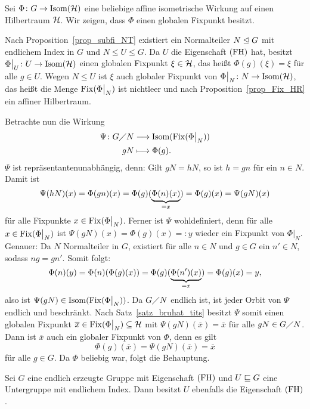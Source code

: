 \begin{beweis}
	Sei $\Phi\colon G \rightarrow \operatorname{Isom}(\mathcal{H})$ eine beliebige affine isometrische Wirkung auf einen Hilbertraum $\mathcal{H}$. Wir zeigen, dass $\Phi$ einen globalen Fixpunkt besitzt.
	
	Nach Proposition~\ref{prop_subfi_NT} existiert ein Normalteiler $N \trianglelefteq G$ mit endlichem Index in $G$ und $N \leq U \leq G$. Da $U$ die Eigenschaft $\operatorname{(FH)}$ hat, besitzt $\Phi\big|_U\colon U \rightarrow \operatorname{Isom}(\mathcal{H})$ einen globalen Fixpunkt $\xi \in \mathcal{H}$, das heißt $\Phi(g)(\xi) = \xi$ für alle $g \in U$. Wegen $N \leq U$ ist $\xi$ auch globaler Fixpunkt von $\Phi\big|_N\colon N \rightarrow \operatorname{Isom}(\mathcal{H})$, das heißt die Menge $\operatorname{Fix}(\Phi\big|_N)$ ist nichtleer und nach Proposition~\ref{prop_Fix_HR} ein affiner Hilbertraum.
	
	Betrachte nun die Wirkung
	\begin{equation}
	\begin{aligned}
		\Psi\colon G \diagup N &\longrightarrow \operatorname{Isom}(\operatorname{Fix}(\Phi\big|_N)) \\
		gN &\longmapsto \Phi(g).
	\end{aligned}
	\end{equation}
	$\Psi$ ist repräsentantenunabhängig, denn: Gilt $gN = hN$, so ist $h = gn$ für ein $n \in N$. Damit ist
	\[
		\Psi(hN)(x) = \Phi(gn)(x) = \Phi(g)({\underbrace{\Phi(n)(x)}_{=x}}) = \Phi(g)(x) = \Psi(gN)(x) 
	\]
	für alle Fixpunkte $x \in \operatorname{Fix}(\Phi\big|_N)$. Ferner ist $\Psi$ wohldefiniert, denn für alle $x \in \operatorname{Fix}(\Phi\big|_N)$ ist $\Psi(gN)(x) = \Phi(g)(x) =: y$ wieder ein Fixpunkt von $\Phi\big|_N$. Genauer: Da $N$ Normalteiler in $G$, existiert für alle $n \in N$ und $g \in G$ ein $n' \in N$, sodass $ng = gn'$. Somit folgt:
	\[
		\Phi(n)(y) = \Phi(n)(\Phi(g)(x)) = \Phi(g)({\underbrace{\Phi(n')(x)}_{=x}}) = \Phi(g)(x) = y,
	\]
	also ist $\Psi(gN) \in \operatorname{Isom}(\operatorname{Fix}(\Phi\big|_N))$.
	\newpage
	Da $G \diagup N$ endlich ist, ist jeder Orbit von $\Psi$ endlich und beschränkt. Nach Satz~\ref{satz_bruhat_tits} besitzt $\Psi$ somit einen globalen Fixpunkt $\overline{x} \in \operatorname{Fix}(\Phi\big|_N) \subseteq \mathcal{H}$ mit $\Psi(gN)(\overline{x}) = \overline{x}$ für alle $gN \in G \diagup N$. Dann ist $\overline{x}$ auch ein globaler Fixpunkt von $\Phi$, denn es gilt
	\[
		\Phi(g)(\overline{x}) = \Psi(gN)(\overline{x}) = \overline{x}
	\]
	für alle $g \in G$. Da $\Phi$ beliebig war, folgt die Behauptung.	
\end{beweis}

\begin{satz}
\label{satz:bhv_2.5.7}
	Sei $G$ eine endlich erzeugte Gruppe mit Eigenschaft $\operatorname{(FH)}$ und $U \sqsubseteq G$ eine Untergruppe mit endlichem Index. Dann besitzt $U$ ebenfalls die Eigenschaft $\operatorname{(FH)}$.
\end{satz}

